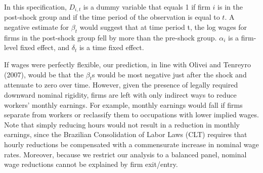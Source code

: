 \documentclass[12pt]{article}
\begin{document}
	In this specification, $D_{i,t}$ is a dummy variable that equals 1 if firm $i$ is in the post-shock group and if the time period of the observation is equal to $t$. A negative estimate for $\beta_t$ would suggest that at time period t, the log wages for firms in the post-shock group fell by more than the pre-shock group. $\alpha_i$ is a firm-level fixed effect, and $\delta_t$ is a time fixed effect. 

	If wages were perfectly flexible, our prediction, in line with Olivei and Tenreyro (2007), would be that the $\beta_t$s would be most negative just after the shock and attenuate to zero over time. However, given the presence of legally required downward nominal rigidity, firms are left with only indirect ways to reduce workers' monthly earnings. For example, monthly earnings would fall if firms separate from workers or reclassify them to occupations with lower implied wages. Note that simply reducing hours would not result in a reduction in monthly earnings, since the Brazilian Consolidation of Labor Laws (CLT) requires that hourly reductions be compensated with a commensurate increase in nominal wage rates.  Moreover, because we restrict our analysis to a balanced panel, nominal wage reductions cannot be explained by firm exit/entry.
\end{document}
